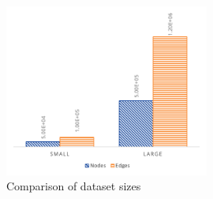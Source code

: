 \begin{figure}[!ht]
    \centering
    \includegraphics[width=0.6\textwidth]{figures/dataset_sizes.png}
    \caption{Comparison of dataset sizes} 
    \label{fig:dataset_sizes}
\end{figure}

